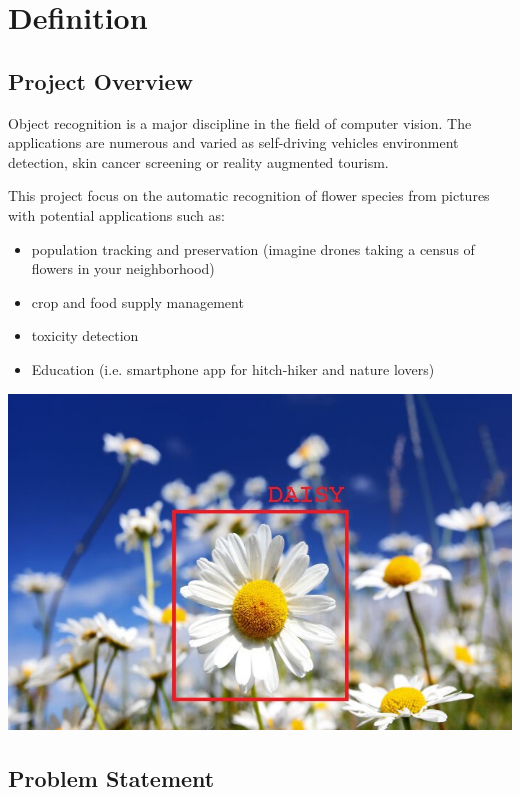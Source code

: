 \section{Definition}

\subsection{Project Overview}

Object recognition is a major discipline in the field of computer vision. The applications are numerous and varied as self-driving vehicles environment detection, skin cancer screening or reality augmented tourism.


This project focus on the automatic recognition of flower species from pictures with potential applications such as:

\begin{itemize}
	\item population tracking and preservation (imagine drones taking a census of flowers in your neighborhood)
	\item crop and food supply management 
	\item toxicity detection 
	\item Education (i.e. smartphone app for hitch-hiker and nature lovers)
\end{itemize}

\begin{center}
\includegraphics[scale=1.3]{Daisy_detection.jpg}
\end{center}


\subsection{Problem Statement}

